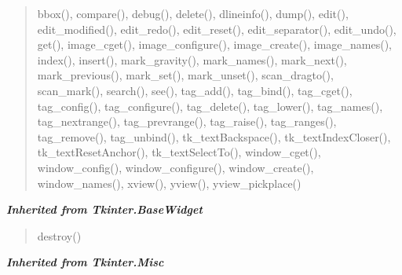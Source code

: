 \begin{quote}
bbox(), compare(), debug(), delete(), dlineinfo(), dump(), edit(), edit\_modified(), edit\_redo(), edit\_reset(), edit\_separator(), edit\_undo(), get(), image\_cget(), image\_configure(), image\_create(), image\_names(), index(), insert(), mark\_gravity(), mark\_names(), mark\_next(), mark\_previous(), mark\_set(), mark\_unset(), scan\_dragto(), scan\_mark(), search(), see(), tag\_add(), tag\_bind(), tag\_cget(), tag\_config(), tag\_configure(), tag\_delete(), tag\_lower(), tag\_names(), tag\_nextrange(), tag\_prevrange(), tag\_raise(), tag\_ranges(), tag\_remove(), tag\_unbind(), tk\_textBackspace(), tk\_textIndexCloser(), tk\_textResetAnchor(), tk\_textSelectTo(), window\_cget(), window\_config(), window\_configure(), window\_create(), window\_names(), xview(), yview(), yview\_pickplace()
\end{quote}

\large{\textbf{\textit{Inherited from Tkinter.BaseWidget}}}

\begin{quote}
destroy()
\end{quote}

\large{\textbf{\textit{Inherited from Tkinter.Misc}}}

